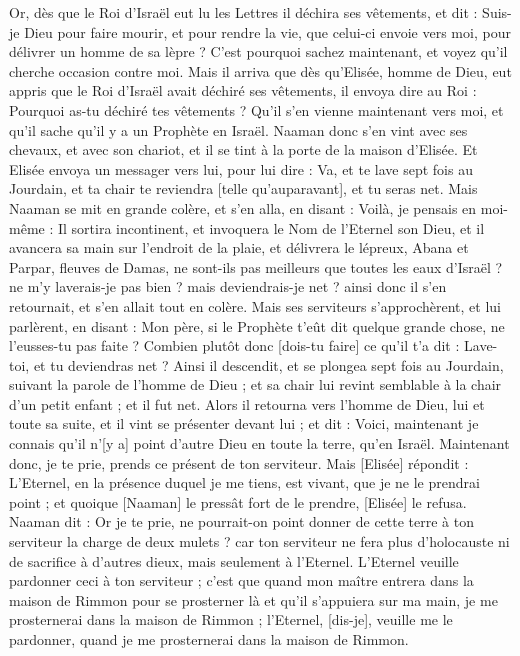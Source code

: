 \begin{multicols}{2}
Or, dès que le Roi d'Israël eut lu les Lettres il déchira ses vêtements, et dit : Suis-je Dieu pour faire mourir, et pour rendre la vie, que celui-ci envoie vers moi, pour délivrer un homme de sa lèpre ? C'est pourquoi sachez maintenant, et voyez qu'il cherche occasion contre moi.
Mais il arriva que dès qu'Elisée, homme de Dieu, eut appris que le Roi d'Israël avait déchiré ses vêtements, il envoya dire au Roi : Pourquoi as-tu déchiré tes vêtements ? Qu'il s'en vienne maintenant vers moi, et qu'il sache qu'il y a un Prophète en Israël.
Naaman donc s'en vint avec ses chevaux, et avec son chariot, et il se tint à la porte de la maison d'Elisée.
Et Elisée envoya un messager vers lui, pour lui dire : Va, et te lave sept fois au Jourdain, et ta chair te reviendra [telle qu'auparavant], et tu seras net.
Mais Naaman se mit en grande colère, et s'en alla, en disant : Voilà, je pensais en moi-même : Il sortira incontinent, et invoquera le Nom de l'Eternel son Dieu, et il avancera sa main sur l'endroit de la plaie, et délivrera le lépreux,
Abana et Parpar, fleuves de Damas, ne sont-ils pas meilleurs que toutes les eaux d'Israël ? ne m'y laverais-je pas bien ? mais deviendrais-je net ? ainsi donc il s'en retournait, et s'en allait tout en colère.
Mais ses serviteurs s'approchèrent, et lui parlèrent, en disant : Mon père, si le Prophète t'eût dit quelque grande chose, ne l'eusses-tu pas faite ? Combien plutôt donc [dois-tu faire] ce qu'il t'a dit : Lave-toi, et tu deviendras net ?
Ainsi il descendit, et se plongea sept fois au Jourdain, suivant la parole de l'homme de Dieu ; et sa chair lui revint semblable à la chair d'un petit enfant ; et il fut net.
Alors il retourna vers l'homme de Dieu, lui et toute sa suite, et il vint se présenter devant lui ; et dit : Voici, maintenant je connais qu'il n'[y a] point d'autre Dieu en toute la terre, qu'en Israël. Maintenant donc, je te prie, prends ce présent de ton serviteur.
Mais [Elisée] répondit : L'Eternel, en la présence duquel je me tiens, est vivant, que je ne le prendrai point ; et quoique [Naaman] le pressât fort de le prendre, [Elisée] le refusa.
Naaman dit : Or je te prie, ne pourrait-on point donner de cette terre à ton serviteur la charge de deux mulets ? car ton serviteur ne fera plus d'holocauste ni de sacrifice à d'autres dieux, mais seulement à l'Eternel.
L'Eternel veuille pardonner ceci à ton serviteur ; c'est que quand mon maître entrera dans la maison de Rimmon pour se prosterner là et qu'il s'appuiera sur ma main, je me prosternerai dans la maison de Rimmon ; l'Eternel, [dis-je], veuille me le pardonner, quand je me prosternerai dans la maison de Rimmon.

\end{multicols}
